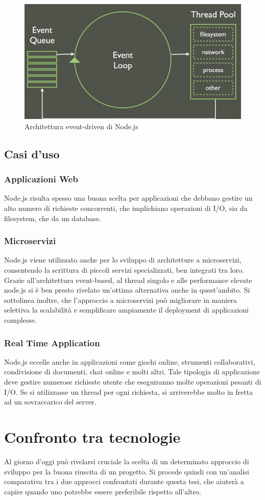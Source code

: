 \newpage
\begin{figure}
        \begin{center}
                \includegraphics[width=0.47\columnwidth]{images/event-loop.jpeg}
        \end{center}
        \caption{Architettura event-driven di Node.js}
\end{figure}
\subsection{Casi d'uso}
\subsubsection{Applicazioni Web}
Node.js risulta spesso una buona scelta per applicazioni che debbano gestire un alto numero di richieste concorrenti, che implichiano operazioni di I/O, sia da filesystem, che da un database.
\subsubsection{Microservizi}
Node.js viene utilizzato anche per lo sviluppo di architetture a microservizi, consentendo la scrittura di piccoli servizi specializzati, ben integrati tra loro. Grazie all'architettura event-based, al thread singolo e alle performance elevate node.js si è ben presto rivelato un'ottima alternativa anche in quest'ambito. Si sottolinea inoltre, che l'approccio a microservizi può migliorare in maniera selettiva la scalabilità e semplificare ampiamente il deployment di applicazioni complesse.
\subsubsection{Real Time Application}
Node.js eccelle anche in applicazioni come giochi online, strumenti collaborativi, condivisione di documenti, chat online e molti altri. Tale tipologia di applicazione deve gestire numerose richieste utente che eseguiranno molte operazioni pesanti di I/O. Se si utilizzasse un thread per ogni richiesta, si arriverebbe molto in fretta ad un sovraccarico del server.
\newpage
\section{Confronto tra tecnologie}
Al giorno d'oggi può rivelarsi cruciale la scelta di un determinato approccio di sviluppo per la buona riuscita di un progetto. Si procede quindi con un'analisi comparativa tra i due approcci confrontati durante questa tesi, che aiuterà a capire quando uno potrebbe essere preferibile rispetto all'altro.
\label{sec:Confronto}
